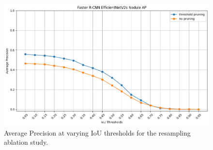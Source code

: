 \begin{figure}[h]
    \centering
    \includegraphics[width=0.8\linewidth]{images/resampling-ablation.png}
    \caption{Average Precision at varying IoU thresholds for the resampling ablation study.}
    \label{fig:resampling-ablation}
\end{figure}